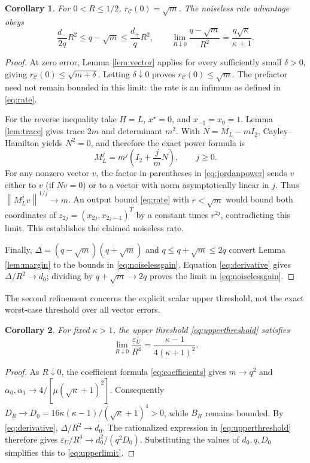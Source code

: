 \documentclass[pdflatex,sn-mathphys-num]{sn-jnl}
\theoremstyle{thmstyleone}
\newtheorem{corollary}{Corollary}
\theoremstyle{thmstyletwo}
\newcommand{\norm}[1]{\left\lVert #1\right\rVert}
\begin{document}
\begin{corollary}\label{cor:noiseless}
For $0<R\leq1/2$, $r_{\mathcal C}(0)=\sqrt m$.
The noiseless rate advantage obeys
\begin{equation}\label{eq:noiselessgain}
 \frac{d_-}{2q}R^2\leq q-\sqrt m\leq\frac{d_+}{q}R^2,
 \qquad
 \lim_{R\downarrow0}\frac{q-\sqrt m}{R^2}
       =\frac{q\sqrt\kappa}{\kappa+1}.
\end{equation}
\end{corollary}
\begin{proof}
At zero error, Lemma \ref{lem:vector} applies for every sufficiently
small $\delta>0$, giving
$r_{\mathcal C}(0)\leq\sqrt{m+\delta}$.
Letting $\delta\downarrow0$ proves
$r_{\mathcal C}(0)\leq\sqrt m$.
The prefactor need not remain bounded in this limit: the rate is
an infimum as defined in \eqref{eq:rate}.

For the reverse inequality take $H=L$, $x^\star=0$, and
$x_{-1}=x_0=1$. Lemma \ref{lem:trace} gives trace $2m$ and
determinant $m^2$. With $N=M_L-mI_2$,
Cayley--Hamilton yields $N^2=0$, and therefore the exact power
formula is
\begin{equation}\label{eq:jordanpower}
 M_L^j=m^j\left(I_2+\frac{j}{m}N\right),\qquad j\geq0 .
\end{equation}
For any nonzero vector $v$, the factor in parentheses in
\eqref{eq:jordanpower} sends $v$ either to $v$ (if $Nv=0$)
or to a vector with norm asymptotically linear in $j$.
Thus $\norm{M_L^jv}^{1/j}\to m$.
An output bound \eqref{eq:rate} with $r<\sqrt m$ would bound
both coordinates of $z_{2j}=(x_{2j},x_{2j-1})^T$ by a
constant times $r^{2j}$, contradicting this limit.
This establishes the claimed noiseless rate.

Finally,
$\Delta=(q-\sqrt m)(q+\sqrt m)$ and
$q\leq q+\sqrt m\leq2q$ convert Lemma \ref{lem:margin}
to the bounds in \eqref{eq:noiselessgain}.
Equation \eqref{eq:derivative} gives $\Delta/R^2\to d_0$;
dividing by $q+\sqrt m\to2q$ proves the limit in
\eqref{eq:noiselessgain}.
\end{proof}

The second refinement concerns the explicit scalar upper threshold,
not the exact worst-case threshold over all vector errors.

\begin{corollary}\label{cor:uppercoefficient}
For fixed $\kappa>1$, the upper threshold
\eqref{eq:upperthreshold} satisfies
\begin{equation}\label{eq:upperlimit}
 \lim_{R\downarrow0}\frac{\varepsilon_U}{R^4}
      =\frac{\kappa-1}{4(\kappa+1)^2}.
\end{equation}
\end{corollary}
\begin{proof}
As $R\downarrow0$, the coefficient formula
\eqref{eq:coefficients} gives
$m\to q^2$ and
$\alpha_0,\alpha_1\to4/[\mu(\sqrt\kappa+1)^2]$.
Consequently
$D_R\to D_0=16\kappa(\kappa-1)/(\sqrt\kappa+1)^4>0$,
while $B_R$ remains bounded. By \eqref{eq:derivative},
$\Delta/R^2\to d_0$.
The rationalized expression in \eqref{eq:upperthreshold}
therefore gives
$\varepsilon_U/R^4\to d_0^2/(q^2D_0)$.
Substituting the values of $d_0,q,D_0$ simplifies this to
\eqref{eq:upperlimit}.
\end{proof}
\end{document}
